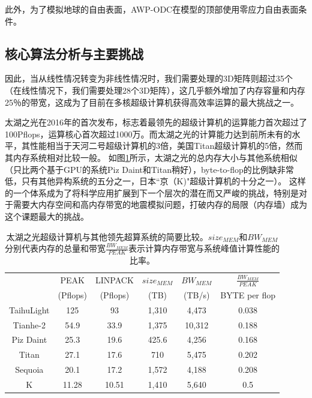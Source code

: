 \documentclass[degree=doctor]{thuthesis}
\begin{document}
此外，为了模拟地球的自由表面，AWP-ODC在模型的顶部使用零应力自由表面条件\cite{gottschammer2001accuracy}。

\subsection{核心算法分析与主要挑战}
因此，当从线性情况转变为非线性情况时，我们需要处理的3D矩阵则超过35个（在线性情况下，我们需要处理28个3D矩阵）\citep {roten2016high}，这几乎额外增加了内存容量和内存25％的带宽，这成为了目前在多核超级计算机获得高效率运算的最大挑战之一。

太湖之光在2016年的首次发布\citep{fu2016sunway}，标志着最领先的超级计算机的运算能力首次超过了100Pflops，运算核心首次超过1000万。而太湖之光的计算能力达到前所未有的水平，其性能相当于天河二号超级计算机的3倍，美国Titan超级计算机的5倍，然而其内存系统相对比较一般。 如图\ref{tb:supercomputer-comp}所示，太湖之光的总内存大小与其他系统相似（只比两个基于GPU的系统Piz Daint和Titan稍好），byte-to-flop的比例缺非常低，只有其他异构系统的五分之一，日本“京（K)"超级计算机的十分之一）。 这样的一个体系成为了将科学应用扩展到下一个层次的潜在而又严峻的挑战，特别是对于需要大内存空间和高内存带宽的地震模拟问题，打破内存的局限（内存墙）成为这个课题最大的挑战。

\begin{table}[ht]
\footnotesize
\caption{太湖之光超级计算机与其他领先超算系统的简要比较。$size_{MEM}$和$BW_{MEM}$分别代表内存的总量和带宽$\frac{BW_{MEM}}{PEAK}$表示计算内存带宽与系统峰值计算性能的比率。}
\label{tb:supercomputer-comp}
\center
\begin{tabular*}{0.8\columnwidth}{cccccc}
\hline\hline
   & PEAK & LINPACK & $size_{MEM}$  & $BW_{MEM}$ & $\frac{BW_{MEM}}{PEAK}$ \\
   & (Pflops) & (Pflops) & (TB) & (TB/s) & {BYTE per flop} \\
   \hline\hline
   TaihuLight & 125 & 93 & 1,310 & 4,473 & 0.038 \\\hline
   Tianhe-2 & 54.9 & 33.9 & 1,375 & 10,312 & 0.188 \\\hline
   Piz Daint & 25.3 & 19.6 & 425.6 & 4,256 & 0.168 \\\hline
   Titan & 27.1 & 17.6 & 710 & 5,475 & 0.202 \\\hline
   Sequoia & 20.1 & 17.2 & 1,572 & 4,188 & 0.208 \\\hline
   K & 11.28 & 10.51 & 1,410 & 5,640 & 0.5 \\\hline
\hline
\end{tabular*}
\end{table}
\end{document}
